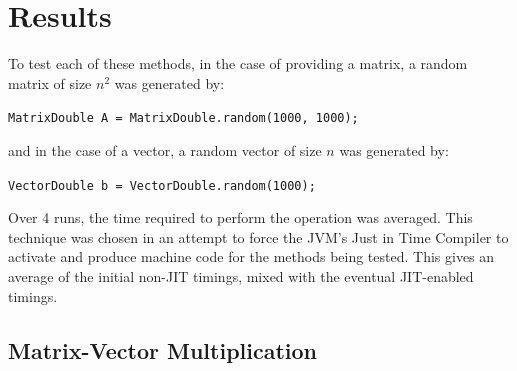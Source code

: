 \documentclass{dependencies/acm_proc_article-sp}
\begin{document}
\section{Results}

To test each of these methods, in the case of providing a matrix, a random matrix of size $n^2$ was generated by:

{\tt MatrixDouble A = MatrixDouble.random(1000, 1000); }

and in the case of a vector, a random vector of size $n$ was generated by:

{\tt VectorDouble b = VectorDouble.random(1000);}

Over 4 runs, the time required to perform the operation was averaged.
This technique was chosen in an attempt to force the JVM's Just in Time
Compiler to activate and produce machine code for the methods
being tested. This gives an average of the initial non-JIT timings, mixed
with the eventual JIT-enabled timings.

\subsection{Matrix-Vector Multiplication}
\end{document}
